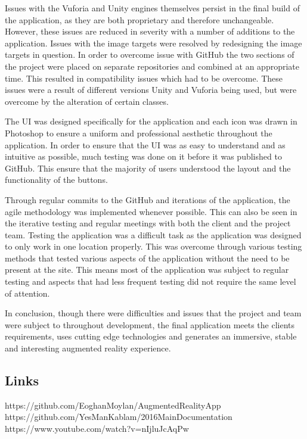 Issues with the Vuforia and Unity engines themselves persist in the final build of the application, as they are both proprietary and therefore unchangeable. However, these issues are reduced in severity with a number of additions to the application. Issues with the image targets were resolved by redesigning the image targets in question. In order to overcome issue with GitHub the two sections of the project were placed on separate repositories and combined at an appropriate time. This resulted in compatibility issues which had to be overcome. These issues were a result of different versions Unity and Vuforia being used, but were overcome by the alteration of certain classes.

The UI was designed specifically for the application and each icon was drawn in Photoshop to ensure a uniform and professional aesthetic throughout the application. In order to ensure that the UI was as easy to understand and as intuitive as possible, much testing was done on it before it was published to GitHub. This ensure that the majority of users understood the layout and the functionality of the buttons.

Through regular commits to the GitHub and iterations of the application, the agile methodology was implemented whenever possible. This can also be seen in the iterative testing and regular meetings with both the client and the project team. Testing the application was a difficult task as the application was designed to only work in one location properly. This was overcome through various testing methods that tested various aspects of the application without the need to be present at the site. This means most of the application was subject to regular testing and aspects that had less frequent testing did not require the same level of attention.

In conclusion, though there were difficulties and issues that the project and team were subject to throughout development, the final application meets the clients requirements, uses cutting edge technologies and generates an immersive, stable and interesting augmented reality experience.

\begin{appendices}
	\chapter{Links}
https://github.com/EoghanMoylan/AugmentedRealityApp \\

https://github.com/YesManKablam/2016MainDocumentation \\

https://www.youtube.com/watch?v=nIjluJcAqPw\\
\end{appendices}